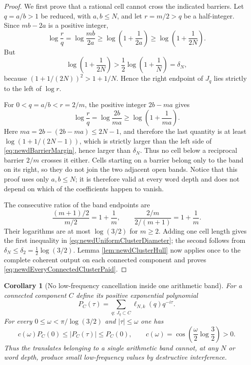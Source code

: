 \documentclass[11pt]{amsart}
\newtheorem{corollary}[theorem]{Corollary}
\theoremstyle{definition}
\theoremstyle{remark}
\begin{document}
\begin{proof}
We first prove that a rational cell cannot cross the indicated barriers.
Let $q=a/b>1$ be reduced, with $a,b\leq N$, and let $r=m/2>q$ be a
half-integer.  Since $mb-2a$ is a positive integer,
\[
 \log\frac rq
 =\log\frac{mb}{2a}
 \geq\log\left(1+\frac1{2a}\right)
 \geq\log\left(1+\frac1{2N}\right).
\]
But
\begin{equation}\label{eq:newdBarrierMargin}
 \log\left(1+\frac1{2N}\right)
 >\frac12\log\left(1+\frac1N\right)=\delta_N,
\end{equation}
because $(1+1/(2N))^2>1+1/N$.  Hence the right endpoint of $J_q$ lies
strictly to the left of $\log r$.

For $0<q=a/b<r=2/m$, the positive integer $2b-ma$ gives
\[
 \log\frac rq
 =\log\frac{2b}{ma}
 \geq\log\left(1+\frac1{ma}\right).
\]
Here $ma=2b-(2b-ma)\leq2N-1$, and therefore the last quantity is at least
$\log(1+1/(2N-1))$, which is strictly larger than the left side of
\eqref{eq:newdBarrierMargin}, hence larger than $\delta_N$.  Thus no cell
below a reciprocal barrier $2/m$ crosses it either.  Cells starting on a
barrier belong only to the band on its right, so they do not join the two
adjacent open bands.  Notice that this proof uses only $a,b\leq N$; it is
therefore valid at every word depth and does not depend on which of the
coefficients happen to vanish.

The consecutive ratios of the band endpoints are
\[
 \frac{(m+1)/2}{m/2}=1+\frac1m,
 \qquad
 \frac{2/m}{2/(m+1)}=1+\frac1m.
\]
Their logarithms are at most $\log(3/2)$ for $m\geq2$.  Adding one cell
length gives the first inequality in
\eqref{eq:newdUniformClusterDiameter}; the second follows from
$\delta_N\leq\delta_2=\tfrac12\log(3/2)$.  Lemma
\ref{lem:newdClusterHull} now applies once to the complete coherent output
on each connected component and proves
\eqref{eq:newdEveryConnectedClusterPaid}.
\end{proof}

\begin{corollary}[No low-frequency cancellation inside one arithmetic band]
\label{cor:newdBandCoherence}
For a connected component $C$ define its positive exponential polynomial
\[
 P_C(\tau)=\sum_{q:\,J_q\subset C}\ell_{N,k}(q)q^{-i\tau}.
\]
For every $0\leq\omega<\pi/\log(3/2)$ and $|\tau|\leq\omega$ one has
\begin{equation}\label{eq:newdBandCoherence}
 c(\omega)P_C(0)\leq |P_C(\tau)|\leq P_C(0),
 \qquad
 c(\omega)=
 \cos\!\left(\frac{\omega}{2}\log\frac32\right)>0.
\end{equation}
Thus the translates belonging to a single arithmetic band cannot, at any
$N$ or word depth, produce small low-frequency values by destructive
interference.
\end{corollary}
\end{document}
